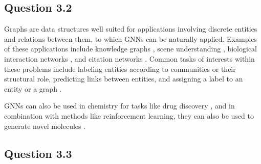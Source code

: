 \documentclass{article}
\begin{document}
\subsection*{Question 3.2}

Graphs are data structures well suited for applications involving discrete entities and relations between them, to which GNNs can be naturally applied. Examples of these applications include knowledge graphs \cite{nickel2016review,schlichtkrull2018modeling,das2018building}, scene understanding \cite{xu2017scene,herzig2018mapping,liang2018symbolic}, biological interaction networks \cite{hamilton2018embedding}, and citation networks \cite{yang2015network,kipf2016semi,zhang2018diffusion}. Common tasks of interests within these problems include labeling entities according to communities or their structural role, predicting links between entities, and assigning a label to an entity or a graph \cite{hamilton2017representation,bojchevski2017deep,cangea2018towards}. 

GNNs can also be used in chemistry for tasks like drug discovery \cite{gilmer2017nmp}, and in combination with methods like reinforcement learning, they can also be used to generate novel molecules \cite{de2018molgan}.

\subsection*{Question 3.3}
\end{document}
